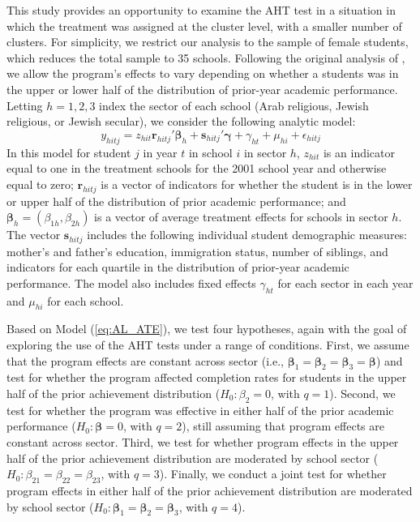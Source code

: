 \documentclass[draft]{ectaart}\usepackage[]{graphicx}\usepackage[]{color}
\newcommand{\bm}{\mathbf}
\newcommand{\bs}{\boldsymbol}
\begin{document}
This study provides an opportunity to examine the AHT test in a situation in which the treatment was assigned at the cluster level, with a smaller number of clusters.
For simplicity, we restrict our analysis to the sample of female students, which reduces the total sample to 35 schools.
Following the original analysis of \citet{Angrist2009effects}, we allow the program's effects to vary depending on whether a students was in the upper or lower half of the distribution of prior-year academic performance. 
Letting $h = 1,2,3$ index the sector of each school (Arab religious, Jewish religious, or Jewish secular), we consider the following analytic model: 
\begin{equation}
\label{eq:AL_ATE}
y_{hitj} = z_{hit}\bm{r}_{hitj}'\bs\beta_h + \bm{s}_{hitj}'\bs\gamma + \gamma_{ht} + \mu_{hi} + \epsilon_{hitj}
\end{equation}
In this model for student $j$ in year $t$ in school $i$ in sector $h$, $z_{hit}$ is an indicator equal to one in the treatment schools for the 2001 school year and otherwise equal to zero; $\bm{r}_{hitj}$ is a vector of indicators for whether the student is in the lower or upper half of the distribution of prior academic performance; and $\bs\beta_h = \left(\beta_{1h}, \beta_{2h}\right)$ is a vector of average treatment effects for schools in sector $h$. 
The vector $\bm{s}_{hitj}$ includes the following individual student demographic measures: mother's and father's education, immigration status, number of siblings, and indicators for each quartile in the distribution of prior-year academic performance. 
The model also includes fixed effects $\gamma_{ht}$ for each sector in each year and $\mu_{hi}$ for each school. 

Based on Model (\ref{eq:AL_ATE}), we test four hypotheses, again with the goal of exploring the use of the AHT tests under a range of conditions. 
First, we assume that the program effects are constant across sector (i.e., $\bs\beta_1 = \bs\beta_2 = \bs\beta_3 = \bs\beta$) and test for whether the program affected completion rates for students in the upper half of the prior achievement distribution ($H_0: \beta_2 = 0$, with $q = 1$).
Second, we test for whether the program was effective in either half of the prior academic performance ($H_0: \bs\beta = 0$, with $q = 2$), still assuming that program effects are constant across sector. 
Third, we test for whether program effects in the upper half of the prior achievement distribution are moderated by school sector ($H_0: \beta_{21} = \beta_{22} = \beta_{23}$, with $q = 3$). 
Finally, we conduct a joint test for whether program effects in either half of the prior achievement distribution are moderated by school sector ($H_0: \bs\beta_1 = \bs\beta_2 = \bs\beta_3$, with $q = 4$). 
\end{document}

